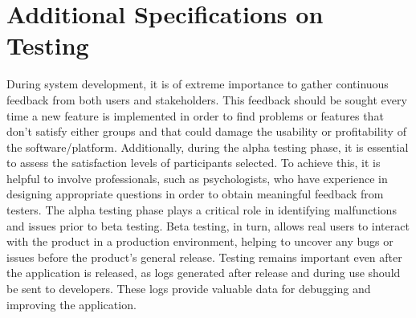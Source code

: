 \section{Additional Specifications on Testing}
During system development, it is of extreme importance to gather continuous feedback from both users and stakeholders. This feedback should be sought every time a new feature is implemented in order to find problems or features that don't satisfy either groups and that could damage the usability or profitability of the software/platform.
Additionally, during the alpha testing phase, it is essential to assess the satisfaction levels of participants selected. To achieve this, it is helpful to involve professionals, such as psychologists, who have experience in designing appropriate questions in order to obtain meaningful feedback from testers. The alpha testing phase plays a critical role in identifying malfunctions and issues prior to beta testing.
Beta testing, in turn, allows real users to interact with the product in a production environment, helping to uncover any bugs or issues before the product's general release. Testing remains important even after the application is released, as logs generated after release and during use should be sent to developers. These logs provide valuable data for debugging and improving the application.

 